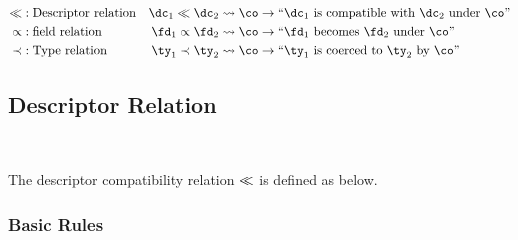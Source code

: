 \begin{align*}
  \dcompat &: \text{Descriptor relation} & \dc_1 \dcompat \dc_2 \coerce \co &\rightarrow \text{``}\dc_1
                                                                              \text{ is
                                                                              compatible
                                                                              with }
                                                                              \dc_2 \text{
                                                                              under
                                                                              }
                                                                              \co
                                                                              \text{''} \\ 
  \fieldrel &: \text{field relation} & \fd_1 \fieldrel \fd_2 \coerce \co &\rightarrow
                                                                           \text{``}\fd_1
                                                                           \text{
                                                                           becomes
                                                                           }
                                                                           \fd_2
                                                                           \text{
                                                                           under
                                                                           }
                                                                           \co \text{''} \\
  \typrel &: \text{Type relation} & \ty_1 \typrel \ty_2 \coerce \co &\rightarrow \text{``}\ty_1\text{
                                                          is coerced to }
                                                          \ty_2 \text{ by } \co \text{''} \\
\end{align*}

\subsection{Descriptor Relation}~\label{sec:desc-rel}

The descriptor compatibility relation $\ll$ is defined as below.

\subsubsection{Basic Rules}

